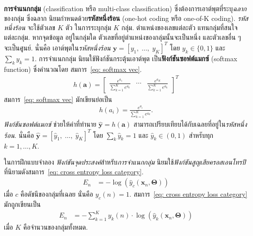 \textbf{การจำแนกกลุ่ม} (classification หรือ multi-class classification)
ซึ่งต้องการเอาต์พุตที่ระบุ\textit{ฉลาก}ของกลุ่ม ซึ่งฉลาก
นิยมกำหนดด้วย\textbf{รหัสหนึ่งร้อน} (one-hot coding หรือ one-of-K coding).
\textit{รหัสหนึ่งร้อน}
จะใช้ตัวเลข $K$ ตัว ในการระบุกลุ่ม $K$ กลุ่ม. ตำแหน่งของเลขแต่ละตัว
แทนกลุ่มที่สนใจ แต่ละกลุ่ม.
หากจุดข้อมูล อยู่ในกลุ่มใด ตัวเลขที่อยู่ตำแหน่งของกลุ่มนั้นจะเป็นหนึ่ง
และตัวเลขอื่น ๆ จะเป็นศูนย์.
นั่นคือ
เอาต์พุตใน\textit{รหัสหนึ่งร้อน} $\bm{y} = [y_1, \; \ldots, \; y_K]^T$ โดย $y_k \in \{0,1\}$ 
และ $\sum_k y_k = 1$.
การจำแนกกลุ่ม นิยมใช้ฟังก์ชันกระตุ้นเอาต์พุต
เป็น\textbf{ฟังก์ชันซอฟต์แมกซ์} (softmax function)
ซึ่งคำนวณโดย
สมการ~\ref{eq: softmax vec}.
\begin{align}
h(\bm{a}) = 
\begin{bmatrix}
\frac{e^{a_1}}{\sum_{k=1}^K e^{a_k}}
&
\cdots
&
\frac{e^{a_K}}{\sum_{k=1}^K e^{a_k}}	
\end{bmatrix}^T
\label{eq: softmax vec}
\end{align}
สมการ~\ref{eq: softmax vec} มักเขียนย่อเป็น
\begin{align}
h(a_i) = \frac{e^{a_i}}{\sum_{k=1}^K e^{a_k}}	
\label{eq: softmax}.
\end{align}
\textit{ฟังก์ชันซอฟต์แมกซ์}
ช่วยให้ค่าที่ทำนาย $\hat{\bm{y}} = h(\bm{a})$
สามารถเปรียบเทียบได้กับเฉลยที่อยู่ใน\textit{รหัสหนึ่งร้อน}.
นั่นคือ
$\bm{\hat{y}} = [\hat{y}_1, \; \ldots, \; \hat{y}_K]^T$ โดย 
$\sum_k \hat{y}_k = 1$
และ
$\hat{y}_k \in (0,1)$ สำหรับทุก $k =1, \ldots, K$.

ในการฝึกแบบจำลอง
\textit{ฟังก์ชันจุดประสงค์}สำหรับ\textit{การจำแนกกลุ่ม}
นิยมใช้\textit{ฟังก์ชันสูญเสียครอสเอนโทรปี}
ที่นิยามดังสมการ~\ref{eq: cross entropy loss category}.
\begin{align}
E_n &
= -\log\left(\hat{y}_c(\bm{x}_n, \bm{\Theta})\right)
\label{eq: cross entropy loss category}
\end{align}
เมื่อ $c$ คือดัชนีของกลุ่มที่เฉลย นั่นคือ $y_c(n) = 1$.
สมการ~\ref{eq: cross entropy loss category}
มักถูกเขียนเป็น
\begin{align}
E_n &
= -\sum_{k=1}^K y_k(n) \cdot \log \left(\hat{y}_k(\bm{x}_n, \bm{\Theta}) \right)
\label{eq: cross entropy loss category short}
\end{align}
เมื่อ $K$ คือจำนวนของกลุ่มทั้งหมด.

